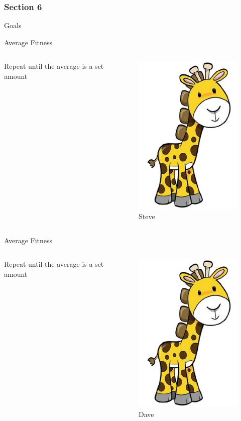 \documentclass[24pt]{beamer}
\begin{document}
    \begin{centering}
        \begin{frame}[c]{}
            \frametitle{Section 6}
            Goals
        \end{frame}
    \end{centering}

    \begin{frame}{Average Fitness}
        \begin{columns}
                Repeat until the average is a set amount
                \begin{figure}
                \includegraphics[scale=0.2]{giraffe}
                \caption{Steve}
                \end{figure}
        \end{columns}
    \end{frame}

    \begin{frame}{Average Fitness}
        \begin{columns}
                Repeat until the average is a set amount
                \begin{figure}
                \includegraphics[scale=0.4]{giraffe}
                \caption{Dave}
                \end{figure}
        \end{columns}
    \end{frame}
\end{document}
